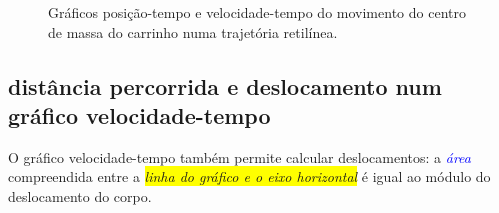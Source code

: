 \documentclass[a4paper,12pt]{article}
\begin{document}
\begin{figure}[H]
		\caption{Gráficos posição-tempo e velocidade-tempo do movimento do centro de massa do carrinho numa trajetória retilínea.}
		\label{fig:grafv2}
	\end{figure}
	
	\subsection{distância percorrida e deslocamento num gráfico velocidade-tempo}
	
	O gráfico velocidade-tempo também permite calcular deslocamentos: a \emph{\textcolor{blue}{área}} compreendida entre a \emph{\colorbox{yellow}{linha do gráfico e o eixo horizontal}} é igual ao módulo do deslocamento do corpo.
	
\end{document}
